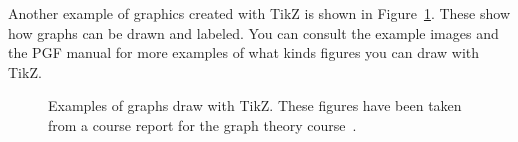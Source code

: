 Another example of graphics created with TikZ is shown in
Figure~\ref{fig:tikz-examples}.
These show how graphs can be drawn and labeled.
You can consult the example images and the PGF manual for more examples of what
kinds figures you can draw with TikZ.

\newlength{\graphdotsize}
\setlength{\graphdotsize}{1.7pt}
\newlength{\graphgridsize}
\setlength{\graphgridsize}{1.2em}
\begin{figure}[ht]
\begin{center}
\caption{Examples of graphs draw with TikZ. These figures have been taken from a
course report for the graph theory course~\cite{FerryProblem}.}
\label{fig:tikz-examples}
\end{center}
\end{figure}
